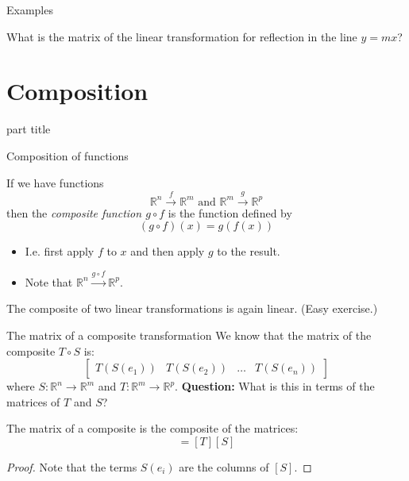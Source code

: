 \documentclass{beamer}
\begin{document}
\begin{frame}{Examples}
\begin{example}
What is the matrix of the linear transformation for reflection in the line $y = mx$?
\end{example}
\end{frame}

\section{Composition}

\begin{frame}
\begin{beamercolorbox}[sep=12pt,center]{part title}
\insertsection\par
\end{beamercolorbox}
\end{frame}

\begin{frame}{Composition of functions}
\begin{definition}
If we have functions
\begin{equation*}
\mathbb{R}^n \xrightarrow{f} \mathbb{R}^m \text{ and }\mathbb{R}^m \xrightarrow{g} \mathbb{R}^p
\end{equation*}
then the \emph{composite function $g\circ f$} is the function defined by
\begin{equation*}
(g\circ f)(x) = g(f(x))
\end{equation*}
\end{definition}
\begin{itemize}
	\item I.e. first apply $f$ to $x$ and then apply $g$ to the result.
	\item Note that $\mathbb{R}^n \xrightarrow{g\circ f} \mathbb{R}^p$.
\end{itemize}
\begin{example}
The composite of two linear transformations is again linear.
(Easy exercise.)
\end{example}
\end{frame}

\begin{frame}{The matrix of a composite transformation}
We know that the matrix of the composite $T\circ S$ is:
\begin{equation*}
\left[
\begin{array}{cccc}
T(S(e_1)) & T(S(e_2)) & \dots & T(S(e_n))
\end{array}
\right]
\end{equation*}
where $S: \mathbb{R}^n \rightarrow \mathbb{R}^m$ and $T: \mathbb{R}^m \rightarrow \mathbb{R}^p$.\vfill
{\bf Question:} What is this in terms of the matrices of $T$ and $S$?\vfill
\begin{theorem}
The matrix of a composite is the composite of the matrices:
\begin{equation*}
[T\circ S] = [T][S]
\end{equation*}
\begin{proof}
Note that the terms $S(e_i)$ are the columns of $[S]$.
\end{proof}
\end{theorem}
\end{frame}
\end{document}
